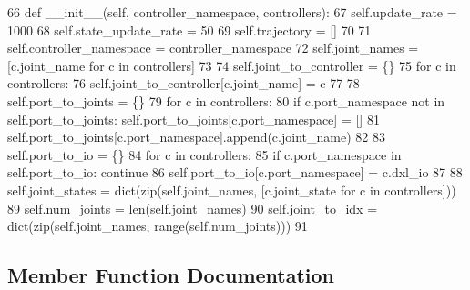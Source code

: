 \begin{DoxyCode}
66     \textcolor{keyword}{def }\_\_init\_\_(self, controller\_namespace, controllers):
67         self.update\_rate = 1000
68         self.state\_update\_rate = 50
69         self.trajectory = []
70         
71         self.controller\_namespace = controller\_namespace
72         self.joint\_names = [c.joint\_name \textcolor{keywordflow}{for} c \textcolor{keywordflow}{in} controllers]
73         
74         self.joint\_to\_controller = \{\}
75         \textcolor{keywordflow}{for} c \textcolor{keywordflow}{in} controllers:
76             self.joint\_to\_controller[c.joint\_name] = c
77             
78         self.port\_to\_joints = \{\}
79         \textcolor{keywordflow}{for} c \textcolor{keywordflow}{in} controllers:
80             \textcolor{keywordflow}{if} c.port\_namespace \textcolor{keywordflow}{not} \textcolor{keywordflow}{in} self.port\_to\_joints: self.port\_to\_joints[c.port\_namespace] = []
81             self.port\_to\_joints[c.port\_namespace].append(c.joint\_name)
82             
83         self.port\_to\_io = \{\}
84         \textcolor{keywordflow}{for} c \textcolor{keywordflow}{in} controllers:
85             \textcolor{keywordflow}{if} c.port\_namespace \textcolor{keywordflow}{in} self.port\_to\_io: \textcolor{keywordflow}{continue}
86             self.port\_to\_io[c.port\_namespace] = c.dxl\_io
87             
88         self.joint\_states = dict(zip(self.joint\_names, [c.joint\_state \textcolor{keywordflow}{for} c \textcolor{keywordflow}{in} controllers]))
89         self.num\_joints = len(self.joint\_names)
90         self.joint\_to\_idx = dict(zip(self.joint\_names, range(self.num\_joints)))
91 
\end{DoxyCode}


\subsection{Member Function Documentation}
\mbox{\label{classdynamixel__controllers_1_1joint__trajectory__action__controller_1_1_joint_trajectory_action_controller_a79e68136bd05bdd0e6efcf2b882c30dd}} 
